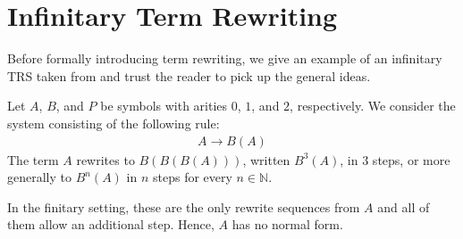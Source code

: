 \chapter{Infinitary Term Rewriting}\label{chap:rewriting}

Before formally introducing term rewriting, we give an example of an
infinitary TRS taken from \citet{klop-de-vrijer-05} and trust the
reader to pick up the general ideas.

Let $A$, $B$, and $P$ be symbols with arities $0$, $1$, and $2$,
respectively. We consider the system consisting of the following rule:
\begin{align*}
A \rightarrow B(A)
\end{align*}
The term $A$
rewrites to $B(B(B(A)))$, written $B^3(A)$, in $3$ steps, or more
generally to $B^n(A)$ in $n$ steps for every $n \in \mathbb{N}$.
\begin{center}
{\footnotesize{}}
\end{center}\vspace{-0.8\baselineskip}
In the finitary setting, these are the only rewrite sequences from $A$
and all of them allow an additional step. Hence, $A$ has no normal
form.

